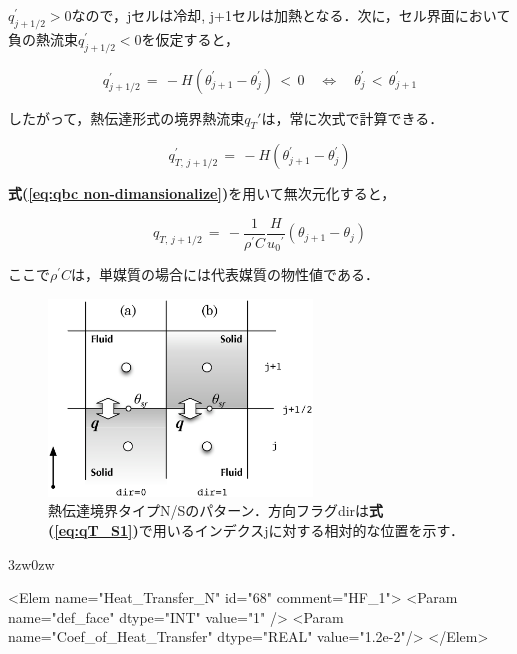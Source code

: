 $q_{j+1/2}^{\prime}>0$なので，jセルは冷却, j+1セルは加熱となる．次に，セル界面において負の熱流束$q_{j+1/2}^{\prime}<0$を仮定すると，

\begin{equation}
q_{j+1/2}^{\prime} \,=\,-H(\theta_{j+1}^{\prime}-\theta_{j}^{\prime})\, <\,0 \quad \Longleftrightarrow \quad \theta_{j}^{\prime} \,<\, \theta_{j+1}^{\prime}
\label{eq:qT_N2}
\end{equation}

したがって，熱伝達形式の境界熱流束$q_{T}'$は，常に次式で計算できる．

\begin{equation}
q_{T,\,j+1/2}^{\prime} \,=\,-H(\theta_{j+1}^{\prime}-\theta_{j}^{\prime})
\label{eq:qT_N3}
\end{equation}

\textbf{式(\ref{eq:qbc non-dimansionalize})}を用いて無次元化すると，

\begin{equation}
q_{T,\,j+1/2} \,=\, - \frac{1}{\rho^{\prime} C} \frac{H}{{u_{\mathit{0}}}^{\prime}}(\theta_{j+1}-\theta_{j})
\label{eq:qT_N4}
\end{equation}

ここで$\rho^{\prime}C$は，単媒質の場合には代表媒質の物性値である．

\begin{figure}[htdp]
\begin{center}
\includegraphics[width=7cm,clip]{typeN.eps}
\caption{熱伝達境界タイプN/Sのパターン．方向フラグdirは\textbf{式(\ref{eq:qT_S1})}で用いるインデクスjに対する相対的な位置を示す．}
\label{fig:typeN}
\end{center}
\end{figure}

\begin{indentation}{3zw}{0zw}
{
\small
\begin{program}
<Elem name="Heat_Transfer_N" id="68"  comment="HF_1">
  <Param name="def_face"    dtype="INT"    value="1" />
  <Param name="Coef_of_Heat_Transfer" dtype="REAL" value="1.2e-2"/>
</Elem>
\end{program}
}
\end{indentation}

